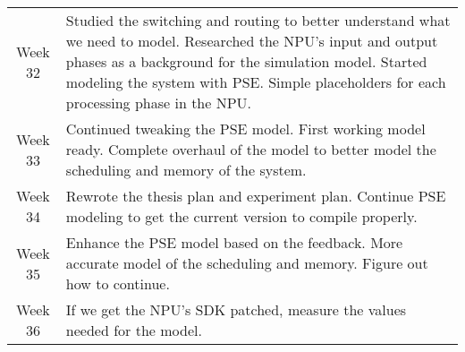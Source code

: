 \begin{center}
\begin{longtable}{@{}c|p{10cm}@{}}
    Week 32 & Studied the switching and routing to better understand what we need to model. Researched the NPU's input and output phases as a background for the simulation model. Started modeling the system with PSE. Simple placeholders for each processing phase in the NPU. \\
    Week 33 & Continued tweaking the PSE model. First working model ready. Complete overhaul of the model to better model the scheduling and memory of the system. \\
    \toprule
    Week 34 & Rewrote the thesis plan and experiment plan. Continue PSE modeling to get the current version to compile properly. \\
    Week 35 & Enhance the PSE model based on the feedback. More accurate model of the scheduling and memory. Figure out how to continue. \\
    Week 36 & If we get the NPU's SDK patched, measure the values needed for the model. \\

    \bottomrule

  \end{longtable}
\end{center}

